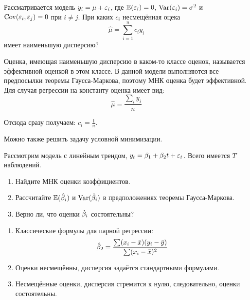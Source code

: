 \begin{problem}
Рассматривается модель $y_i=\mu+\varepsilon_i$, где $\mathbb{E}(\varepsilon_i)=0$, $\operatorname{Var}(\varepsilon_i)=\sigma^2$ и $\operatorname{Cov}(\varepsilon_i,\varepsilon_j)=0$ при $i\neq j$. При каких $c_i$ несмещённая оцека
\[
\hat{\mu}=\sum_{i=1}^{n} c_i y_i
\]
имеет наименьшую дисперсию?


\begin{sol}

Оценка, имеющая наименьшую дисперсию в каком-то классе оценок, называется эффективной оценкой в этом классе. В данной модели выполняются все предпосылки теоремы Гаусса-Маркова, поэтому МНК оценка будет эффективной. Для случая регрессии на константу оценка имеет вид:
\[
\hat{\mu} = \frac{\sum\limits_i y_i}{n}
\]

Отсюда сразу получаем: $c_i = \frac{1}{n}$.

Можно также решить задачу условной минимизации.
\end{sol}
\end{problem}


\begin{problem}
Рассмотрим модель с линейным трендом, $y_t=\beta_1 + \beta_2 t +\varepsilon_t$. Всего имеется $T$ наблюдений.
\begin{enumerate}
\item Найдите МНК оценки коэффициентов.
\item Рассчитайте $\mathbb{E}(\hat{\beta}_i)$ и $\operatorname{Var}(\hat{\beta}_i)$ в предположениях теоремы Гаусса-Маркова.
\item Верно ли, что оценки $\hat{\beta}_i$ состоятельны?
\end{enumerate}

\begin{sol}
\begin{enumerate}
\item Классические формулы для парной регрессии:
\[
\hat{\beta}_2 = \frac{\sum(x_i - \bar x)(y_i - \bar y)}{\sum (x_i - \bar x)^2}
\]

\item Оценки несмещённы, дисперсия задаётся стандартными формулами.


\item Несмещённые оценки, дисперсия стремится к нулю, следовательно, оценки состоятельны.

\end{enumerate}
\end{sol}
\end{problem}



